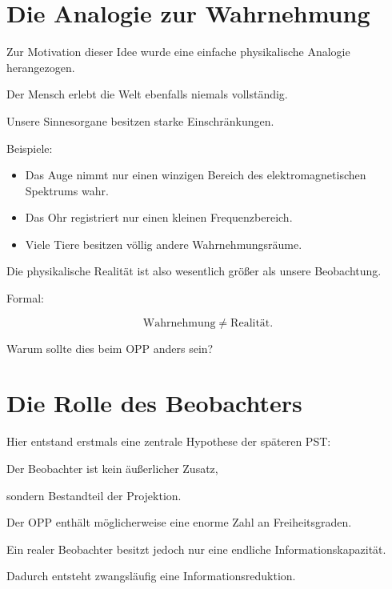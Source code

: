 \section*{Die Analogie zur Wahrnehmung}

Zur Motivation dieser Idee wurde eine einfache physikalische Analogie herangezogen.

Der Mensch erlebt die Welt ebenfalls niemals vollständig.

Unsere Sinnesorgane besitzen starke Einschränkungen.

Beispiele:

\begin{itemize}

\item

Das Auge nimmt nur einen winzigen Bereich des elektromagnetischen Spektrums wahr.

\item

Das Ohr registriert nur einen kleinen Frequenzbereich.

\item

Viele Tiere besitzen völlig andere Wahrnehmungsräume.

\end{itemize}

Die physikalische Realität ist also wesentlich größer als unsere Beobachtung.

Formal:

\[
\boxed{
\text{Wahrnehmung}
\neq
\text{Realität}.
}
\]

Warum sollte dies beim OPP anders sein?


\section*{Die Rolle des Beobachters}

Hier entstand erstmals eine zentrale Hypothese der späteren PST:

Der Beobachter ist kein äußerlicher Zusatz,

sondern Bestandteil der Projektion.

Der OPP enthält möglicherweise eine enorme Zahl an Freiheitsgraden.

Ein realer Beobachter besitzt jedoch nur eine endliche Informationskapazität.

Dadurch entsteht zwangsläufig eine Informationsreduktion.

